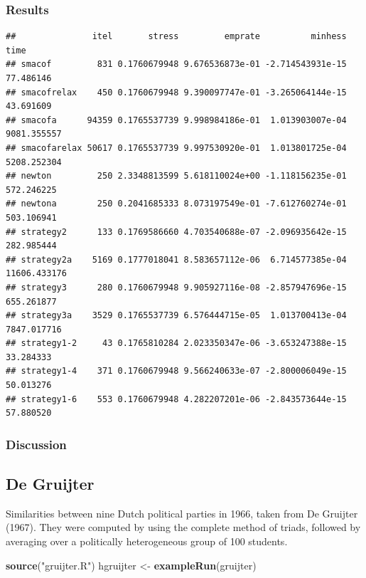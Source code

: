 \documentclass[
  12pt,
]{article}
\newenvironment{Shaded}{\begin{snugshade}}{\end{snugshade}}
\newcommand{\FunctionTok}[1]{\textcolor[rgb]{0.13,0.29,0.53}{\textbf{#1}}}
\newcommand{\NormalTok}[1]{#1}
\newcommand{\OtherTok}[1]{\textcolor[rgb]{0.56,0.35,0.01}{#1}}
\newcommand{\StringTok}[1]{\textcolor[rgb]{0.31,0.60,0.02}{#1}}
\begin{document}
\subsubsection{Results}\label{results-3}

\begin{verbatim}
##               itel       stress         emprate          minhess         time
## smacof         831 0.1760679948 9.676536873e-01 -2.714543931e-15    77.486146
## smacofrelax    450 0.1760679948 9.390097747e-01 -3.265064144e-15    43.691609
## smacofa      94359 0.1765537739 9.998984186e-01  1.013903007e-04  9081.355557
## smacofarelax 50617 0.1765537739 9.997530920e-01  1.013801725e-04  5208.252304
## newton         250 2.3348813599 5.618110024e+00 -1.118156235e-01   572.246225
## newtona        250 0.2041685333 8.073197549e-01 -7.612760274e-01   503.106941
## strategy2      133 0.1769586660 4.703540688e-07 -2.096935642e-15   282.985444
## strategy2a    5169 0.1777018041 8.583657112e-06  6.714577385e-04 11606.433176
## strategy3      280 0.1760679948 9.905927116e-08 -2.857947696e-15   655.261877
## strategy3a    3529 0.1765537739 6.576444715e-05  1.013700413e-04  7847.017716
## strategy1-2     43 0.1765810284 2.023350347e-06 -3.653247388e-15    33.284333
## strategy1-4    371 0.1760679948 9.566240633e-07 -2.800006049e-15    50.013276
## strategy1-6    553 0.1760679948 4.282207201e-06 -2.843573644e-15    57.880520
\end{verbatim}

\subsubsection{Discussion}\label{discussion-3}

\subsection{De Gruijter}\label{de-gruijter}

Similarities between nine Dutch political parties in 1966, taken from De Gruijter (1967).
They were computed by using the complete method of triads, followed by
averaging over a politically heterogeneous group of 100 students.

\begin{Shaded}
\begin{Highlighting}[]
\FunctionTok{source}\NormalTok{(}\StringTok{"gruijter.R"}\NormalTok{)}
\NormalTok{hgruijter }\OtherTok{\textless{}{-}} \FunctionTok{exampleRun}\NormalTok{(gruijter)}
\end{Highlighting}
\end{Shaded}
\end{document}
